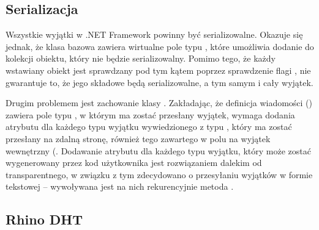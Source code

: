 \subsection{Serializacja}

Wszystkie wyjątki w .NET Framework powinny być serializowalne. Okazuje
się jednak, że klasa bazowa  zawiera wirtualne
pole  typu , które umożliwia
dodanie do kolekcji obiektu, który nie będzie serializowalny. Pomimo
tego, że każdy wstawiany obiekt jest sprawdzany pod tym kątem poprzez
sprawdzenie flagi , nie gwarantuje to,
że jego składowe będą serializowalne, a tym samym i cały wyjątek. 

Drugim problemem jest zachowanie klasy .
Zakładając, że definicja wiadomości () zawiera
pole typu , w którym ma zostać przesłany wyjątek,
 wymaga dodania atrybutu 
dla każdego typu wyjątku wywiedzionego z typu ,
który ma zostać przesłany na zdalną stronę, również tego zawartego
w polu na wyjątek wewnętrzny (. Dodawanie
atrybutu  dla każdego typu wyjątku, który może
zostać wygenerowany przez kod użytkownika jest rozwiązaniem dalekim
od transparentnego, w związku z tym zdecydowano o przesyłaniu wyjątków
w formie tekstowej -- wywoływana jest na nich rekurencyjnie metoda
.


\subsection{Rhino DHT}

